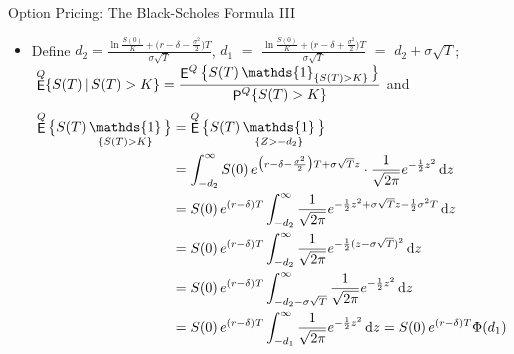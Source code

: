 \documentclass[10pt,handout]{beamer}
\DeclareMathOperator\indc{\mathds{1}}
\newcommand{\ds}{\displaystyle}
\DeclareMathOperator\prb{{\sf P}}
\DeclareMathOperator\expc{{\sf E}}
\theoremstyle{definition}
\begin{document}
\begin{frame}{Option Pricing: The Black-Scholes Formula III}
  \begin{itemize} 
    \item Define $\ds d_2 = \frac{\ln\frac{S(0)}{K} + \big(r - \delta - \frac{\sigma^2}{2}\big)T}{\sigma\sqrt{T}}$, $\ds d_1$ $=$ $\ds\frac{\ln\frac{S(0)}{K} + \big(r - \delta + \frac{\sigma^2}{2}\big)T}{\sigma\sqrt{T}}$ $=$ $d_2 + \sigma\sqrt{T}$; $\;\ds\expc^Q\{S(T)\,|\, S(T) > K\} = \frac{\expc^Q\big\{S(T)\indc_{\{S(T) > K\}}\big\}}{\prb^Q\{S(T) > K\}}$ and \vspace{-2mm}
      \begin{align*}
        \expc^Q\big\{S(T)\indc_{\{S(T) > K\}}\big\} &= \expc^Q\big\{S(T)\indc_{\{Z > -d_2\}}\big\} \\
        &= \int_{-d_2}^\infty S(0)\,e^{\big(r - \delta - \frac{\sigma^2}{2}\big)T + \sigma\sqrt{T}z}\cdot\frac{1}{\sqrt{2\pi}}e^{-\frac{1}{2}z^2}\,\mathrm{d}z \\
        &= S(0)\,e^{(r - \delta)T}\int_{-d_2}^\infty \frac{1}{\sqrt{2\pi}}e^{-\frac{1}{2}z^2 + \sigma\sqrt{T}z - \frac{1}{2}\sigma^2 T}\,\mathrm{d}z \\
        &= S(0)\,e^{(r - \delta)T}\int_{-d_2}^\infty \frac{1}{\sqrt{2\pi}}e^{-\frac{1}{2}(z - \sigma\sqrt{T})^2}\,\mathrm{d}z \\
        &= S(0)\,e^{(r - \delta)T}\int_{-d_2-\sigma\sqrt{T}}^\infty \frac{1}{\sqrt{2\pi}}e^{-\frac{1}{2}z^2}\,\mathrm{d}z \\
        &= S(0)\,e^{(r - \delta)T}\int_{-d_1}^\infty \frac{1}{\sqrt{2\pi}}e^{-\frac{1}{2}z^2}\,\mathrm{d}z = S(0)\,e^{(r - \delta)T}\Phi(d_1)
      \end{align*} 
  \end{itemize}
\end{frame}
\end{document}

